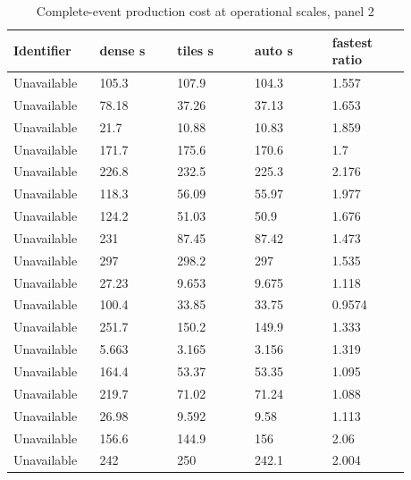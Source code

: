 \begin{longtable}{p{0.1760\linewidth}p{0.1760\linewidth}p{0.1760\linewidth}p{0.1760\linewidth}p{0.1760\linewidth}}
\caption{Complete-event production cost at operational scales, panel 2}\\
\hline
Identifier & dense s & tiles s & auto s & fastest ratio \\
\hline\endhead
Unavailable & 105.3 & 107.9 & 104.3 & 1.557 \\
Unavailable & 78.18 & 37.26 & 37.13 & 1.653 \\
Unavailable & 21.7 & 10.88 & 10.83 & 1.859 \\
Unavailable & 171.7 & 175.6 & 170.6 & 1.7 \\
Unavailable & 226.8 & 232.5 & 225.3 & 2.176 \\
Unavailable & 118.3 & 56.09 & 55.97 & 1.977 \\
Unavailable & 124.2 & 51.03 & 50.9 & 1.676 \\
Unavailable & 231 & 87.45 & 87.42 & 1.473 \\
Unavailable & 297 & 298.2 & 297 & 1.535 \\
Unavailable & 27.23 & 9.653 & 9.675 & 1.118 \\
Unavailable & 100.4 & 33.85 & 33.75 & 0.9574 \\
Unavailable & 251.7 & 150.2 & 149.9 & 1.333 \\
Unavailable & 5.663 & 3.165 & 3.156 & 1.319 \\
Unavailable & 164.4 & 53.37 & 53.35 & 1.095 \\
Unavailable & 219.7 & 71.02 & 71.24 & 1.088 \\
Unavailable & 26.98 & 9.592 & 9.58 & 1.113 \\
Unavailable & 156.6 & 144.9 & 156 & 2.06 \\
Unavailable & 242 & 250 & 242.1 & 2.004 \\
\end{longtable}
